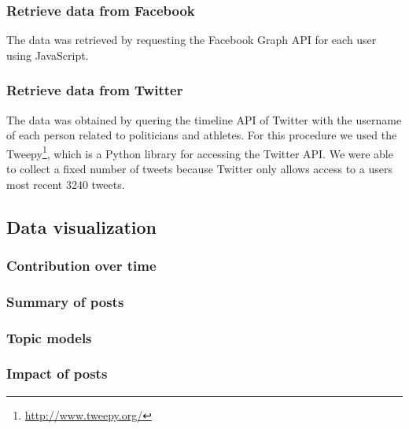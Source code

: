 \subsubsection{Retrieve data from Facebook}
The data was retrieved by requesting the Facebook Graph API for each user using JavaScript.

\subsubsection{Retrieve data from Twitter}

The data was obtained by quering the timeline API of Twitter with the username of each person related to politicians and athletes. For this procedure we used the Tweepy\footnote{\url{http://www.tweepy.org/}}, which is a Python library for accessing the Twitter API. We were able to collect a fixed number of tweets because Twitter only allows access to a users most recent 3240 tweets.  

\subsection{Data visualization}
\subsubsection{Contribution over time}
\subsubsection{Summary of posts}
\subsubsection{Topic models}
\subsubsection{Impact of posts}


